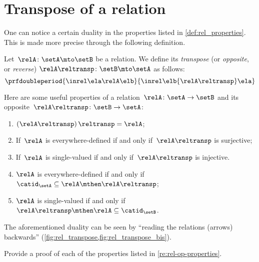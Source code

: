 \section{Transpose of a relation}

One can notice a certain duality in the properties listed in \cref{def:rel_properties}.
This is made more precise through the following definition.

\begin{ctdefinition}
	\label{def:relation-transpose}
	Let~$\relA\colon \setA\mto \setB$ be a relation.
	We define its \emph{transpose} (or \emph{opposite}, or \emph{reverse}) $\relA\reltransp\colon \setB \mto \setA$ as follows:
	\begin{equation*}
		\prfdoubleperiod{
			\inrel \ela \relA \elb
		}{
			\inrel \elb {\relA\reltransp} \ela
		}
	\end{equation*}
\end{ctdefinition}
\begin{remark}
	\label{re:rel-op-properties}
	Here are some useful properties of a relation~$\relA\colon \setA\to \setB$  and its opposite~$\relA\reltransp\colon \setB\to \setA$:
	\begin{enumerate}
		\item $\left(\relA\reltransp\right)\reltransp = \relA $;
		\item If~$\relA$ is everywhere-defined if and only if~$\relA\reltransp$ is surjective;
		\item If~$\relA$ is single-valued if and only if~$\relA\reltransp$ is injective.
		\item $\relA$ is everywhere-defined if and only if~$\catid_\setA\subseteq \relA \mthen \relA\reltransp$;
		\item $\relA$ is single-valued if and only if~$\relA\reltransp\mthen \relA\subseteq \catid_\setB$.
	\end{enumerate}
\end{remark}

\begin{marginfigure}
	\centering
	\caption{}
	\label{fig:rel_transpose}
\end{marginfigure}

\begin{marginfigure}
	\centering
	\caption{}
	\label{fig:rel_transpose_bis}
\end{marginfigure}

\begin{remark}
	The aforementioned duality can be seen by ``reading the relations (arrows) backwards'' (\cref{fig:rel_transpose,fig:rel_transpose_bis}).
\end{remark}

\vfill
\begin{gradedexercise}
	\label{ex:RelProperties}
	Provide a proof of each of the properties listed in \cref{re:rel-op-properties}.
\end{gradedexercise}

